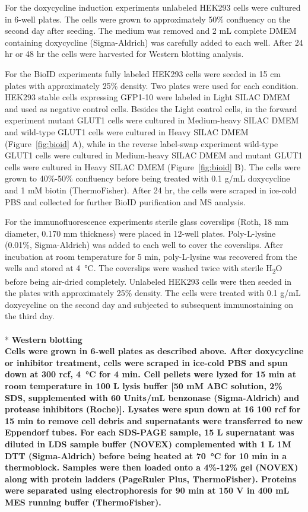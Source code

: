 For the doxycycline induction experiments unlabeled HEK293 cells were cultured in 6-well plates. The cells were grown to approximately 50\% confluency on the second day after seeding. The medium was removed and 2 mL complete DMEM containing doxycycline (Sigma-Aldrich) was carefully added to each well. After 24 hr or 48 hr the cells were harvested for Western blotting analysis.

For the BioID experiments fully labeled HEK293 cells were seeded in 15 cm plates with approximately 25\% density. Two plates were used for each condition. HEK293 stable cells expressing GFP1-10 were labeled in Light SILAC DMEM and used as negative control cells. Besides the Light control cells, in the forward experiment mutant GLUT1 cells were cultured in Medium-heavy SILAC DMEM and wild-type GLUT1 cells were cultured in Heavy SILAC DMEM (Figure~\ref{fig:bioid} A), while in the reverse label-swap experiment wild-type GLUT1 cells were cultured in Medium-heavy SILAC DMEM and mutant GLUT1 cells were cultured in Heavy SILAC DMEM (Figure~\ref{fig:bioid} B). The cells were grown to 40\%-50\% confluency before being treated with 0.1 {}\textmu g/mL doxycycline and 1 mM biotin (ThermoFisher). After 24 hr, the cells were scraped in ice-cold PBS and collected for further BioID purification and MS analysis.

For the immunofluorescence experiments sterile glass coverslips (Roth, 18 mm diameter, 0.170 mm thickness) were placed in 12-well plates. Poly-L-lysine (0.01\%, Sigma-Aldrich) was added to each well to cover the coverslips. After incubation at room temperature for 5 min, poly-L-lysine was recovered from the wells and stored at \SI{4}{\celsius}. The coverslips were washed twice with sterile H\textsubscript{2}O before being air-dried completely. Unlabeled HEK293 cells were then seeded in the plates with approximately 25\% density. The cells were treated with 0.1 {}\textmu g/mL doxycycline on the second day and subjected to subsequent immunostaining on the third day.
\\
\\*
\bfseries{Western blotting}\\
\normalfont Cells were grown in 6-well plates as described above. After doxycycline or inhibitor treatment, cells were scraped in ice-cold PBS and spun down at 300 rcf, \SI{4}{\celsius} for 4 min. Cell pellets were lyzed for 15 min at room temperature in 100 \textmu L lysis buffer [50 mM ABC solution, 2\% SDS, supplemented with 60 Units/mL benzonase (Sigma-Aldrich) and protease inhibitors (Roche)]. Lysates were spun down at 16 100 rcf for 15 min to remove cell debris and supernatants were transferred to new Eppendorf tubes. For each SDS-PAGE sample, 15 {}\textmu L supernatant was diluted in LDS sample buffer (NOVEX) complemented with 1 {}\textmu L 1M DTT (Sigma-Aldrich) before being heated at \SI{70}{\celsius} for 10 min in a thermoblock. Samples were then loaded onto a 4\%-12\% gel (NOVEX) along with protein ladders (PageRuler Plus, ThermoFisher). Proteins were separated using electrophoresis for 90 min at 150 V in 400 mL MES running buffer (ThermoFisher). 

